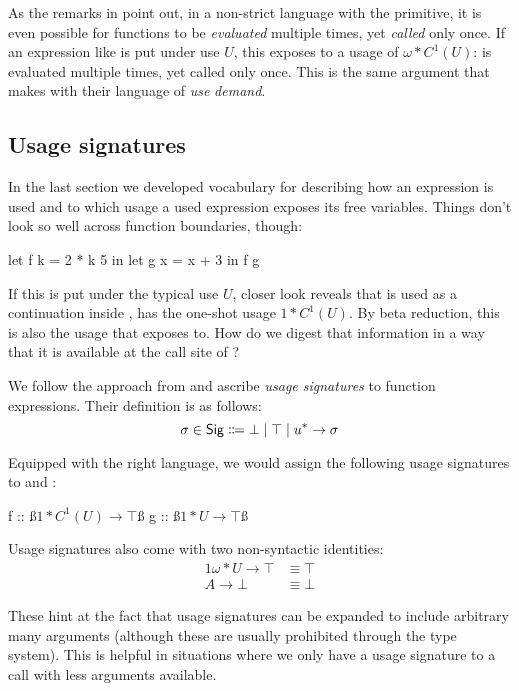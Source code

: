 As the remarks in \textcite[Section~2.5]{card} point out, in a non-strict language with the  primitive, it is even possible for functions to be \emph{evaluated} multiple times, yet \emph{called} only once.
If an expression like  is put under use $U$, this exposes  to a usage of $\omega*C^1(U)$:  is evaluated multiple times, yet called only once.
This is the same argument that \textcite[Appendix~C.2]{warnsbrough} makes with their language of \emph{use} \vs \emph{demand}.

\subsection{Usage signatures}

In the last section we developed vocabulary for describing how an expression is used and to which usage a used expression exposes its free variables. Things don't look so well across function boundaries, though:

\begin{haskellcode}
let f k = 2 * k 5
in let g x = x + 3 
   in f g
\end{haskellcode}

If this is put under the typical use $U$, closer look reveals that  is used as a continuation inside , \eg has the one-shot usage $1*C^1(U)$.
By beta reduction, this is also the usage that  exposes  to.
How do we digest that information in a way that it is available at the call site of ?

We follow the approach from \textcite{card} and ascribe \emph{usage signatures} to function expressions. Their definition is as follows:
\[
\sigma \in \text{\textsf{Sig}} \Coloneqq \bot \mid \top \mid u^* \to \sigma
\]

Equipped with the right language, we would assign the following usage signatures to  and :

\begin{haskellcode}
f :: ß$1*C^1(U) \to \top$ß
g :: ß$1*U \to \top$ß
\end{haskellcode}

Usage signatures also come with two non-syntactic identities:
\begin{alignat*}{1}
  \omega*U \to \top &\equiv \top \\ 
  A \to \bot        &\equiv \bot
\end{alignat*}

These hint at the fact that usage signatures can be expanded to include arbitrary many arguments (although these are usually prohibited through the type system). 
This is helpful in situations where we only have a usage signature to a call with less arguments available. 

